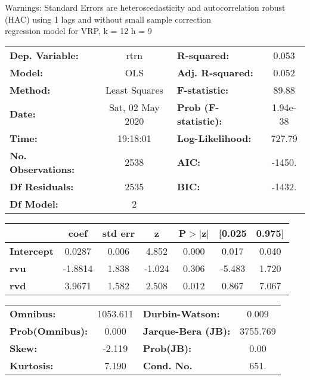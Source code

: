 Warnings: \newline
 [1] Standard Errors are heteroscedasticity and autocorrelation robust (HAC) using 1 lags and without small sample correction\\ 

regression model for VRP, k = 12 h = 9\begin{center}
\begin{tabular}{lclc}
\toprule
\textbf{Dep. Variable:}    &       rtrn       & \textbf{  R-squared:         } &     0.053   \\
\textbf{Model:}            &       OLS        & \textbf{  Adj. R-squared:    } &     0.052   \\
\textbf{Method:}           &  Least Squares   & \textbf{  F-statistic:       } &     89.88   \\
\textbf{Date:}             & Sat, 02 May 2020 & \textbf{  Prob (F-statistic):} &  1.94e-38   \\
\textbf{Time:}             &     19:18:01     & \textbf{  Log-Likelihood:    } &    727.79   \\
\textbf{No. Observations:} &        2538      & \textbf{  AIC:               } &    -1450.   \\
\textbf{Df Residuals:}     &        2535      & \textbf{  BIC:               } &    -1432.   \\
\textbf{Df Model:}         &           2      & \textbf{                     } &             \\
\bottomrule
\end{tabular}
\begin{tabular}{lcccccc}
                   & \textbf{coef} & \textbf{std err} & \textbf{z} & \textbf{P$> |$z$|$} & \textbf{[0.025} & \textbf{0.975]}  \\
\midrule
\textbf{Intercept} &       0.0287  &        0.006     &     4.852  &         0.000        &        0.017    &        0.040     \\
\textbf{rvu}       &      -1.8814  &        1.838     &    -1.024  &         0.306        &       -5.483    &        1.720     \\
\textbf{rvd}       &       3.9671  &        1.582     &     2.508  &         0.012        &        0.867    &        7.067     \\
\bottomrule
\end{tabular}
\begin{tabular}{lclc}
\textbf{Omnibus:}       & 1053.611 & \textbf{  Durbin-Watson:     } &    0.009  \\
\textbf{Prob(Omnibus):} &   0.000  & \textbf{  Jarque-Bera (JB):  } & 3755.769  \\
\textbf{Skew:}          &  -2.119  & \textbf{  Prob(JB):          } &     0.00  \\
\textbf{Kurtosis:}      &   7.190  & \textbf{  Cond. No.          } &     651.  \\
\bottomrule
\end{tabular}
\end{center}

